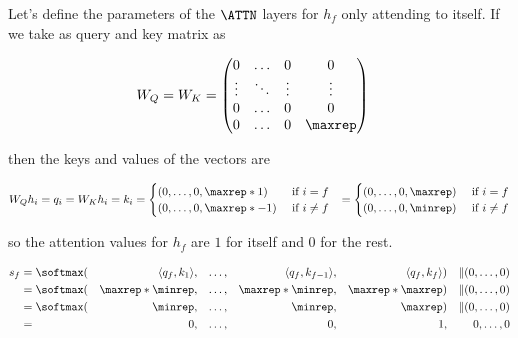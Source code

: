 Let's define the parameters of the $\ATTN$ layers for $h_f$ only attending to itself. 
If we take as query and key matrix as

\begin{align*}
    & W_Q = W_K = \left(\begin{matrix}
                    0      &\hdots &0      &0          \\
                    \vdots &\ddots &\vdots &\vdots     \\
                    0      &\hdots &0      &0          \\
                    0      &\hdots &0      &\maxrep    \\
                  \end{matrix}\right)
\end{align*}

\noindent then the keys and values of the vectors are 

\begin{align*}
    W_Q h_i = q_i = W_K h_i = k_i &= \begin{cases}
                            (0, \dots, 0, \maxrep*1)     &\text{ if } i = f    \\
                            (0, \dots, 0, \maxrep*-1)    &\text{ if } i \neq f \\
                          \end{cases}
                       &= \begin{cases}
                            (0, \dots, 0, \maxrep)    &\text{ if } i = f    \\
                            (0, \dots, 0, \minrep)    &\text{ if } i \neq f \\
                          \end{cases}
\end{align*}

\noindent so the attention values for $h_f$ are $1$ for itself and 0 for the rest.

\begin{align*}
    s_f & = \softmax (&\langle q_f, k_1 \rangle,& &\ldots,& &\langle q_f, k_{f-1}\rangle,& &\langle q_f, k_f\rangle) &&\| (0,\ldots, 0) \\
        & = \softmax (&\maxrep * \minrep,&        &\ldots,& &\maxrep * \minrep,          & &\maxrep*\maxrep)         &&\| (0,\ldots, 0) \\
        & = \softmax (&          \minrep,&        &\ldots,& &          \minrep,          & &        \maxrep)         &&\| (0,\ldots, 0) \\
        & =           &                0,&        &\ldots,& &                0,          & &               1,        && 0,\ldots, 0 \\
\end{align*}

